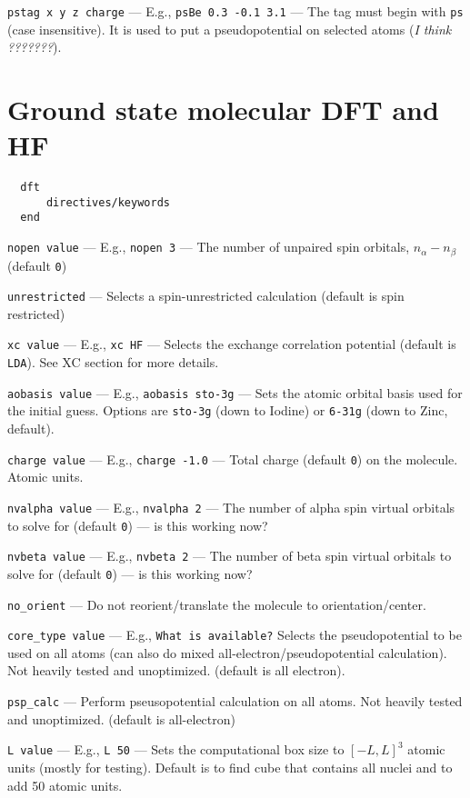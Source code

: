 \documentclass[letterpaper]{book}
\begin{document}
{\tt pstag x y z charge} --- E.g., {\tt psBe 0.3 -0.1 3.1} --- The tag must begin with {\tt ps} (case insensitive).  It is used to put a pseudopotential on selected atoms ({\em I think ???????}).


\chapter{Ground state molecular DFT and HF}

\begin{verbatim}
  dft
      directives/keywords
  end
\end{verbatim}

{\tt nopen value} --- E.g., {\tt nopen 3} --- The number of unpaired spin orbitals, $n_\alpha - n_\beta$ (default {\tt 0})

{\tt unrestricted} --- Selects a spin-unrestricted calculation (default is spin restricted)

{\tt xc value} --- E.g., {\tt xc HF} --- Selects the exchange correlation potential (default is {\tt LDA}). See XC section for more details.

{\tt aobasis value} --- E.g., {\tt aobasis sto-3g} --- Sets the atomic orbital basis used for the initial guess.  Options are {\tt sto-3g} (down to Iodine)  or {\tt 6-31g} (down to Zinc, default).  

{\tt charge value} --- E.g., {\tt charge -1.0} --- Total charge (default {\tt 0}) on the molecule. Atomic units.

{\tt nvalpha value} --- E.g., {\tt nvalpha 2} --- The number of alpha spin virtual orbitals to solve for (default {\tt 0}) --- is this working now?

{\tt nvbeta value} --- E.g., {\tt nvbeta 2} --- The number of beta spin virtual orbitals to solve for (default {\tt 0}) --- is this working now?

{\tt no\_orient} --- Do not reorient/translate the molecule to orientation/center.

{\tt core\_type value} --- E.g., {\tt What is available?} Selects the pseudopotential to be used on all atoms (can also do mixed all-electron/pseudopotential calculation).  Not heavily tested and unoptimized. (default is all electron).

{\tt psp\_calc} --- Perform pseusopotential calculation on all atoms.  Not heavily tested and unoptimized. (default is all-electron)

{\tt L value} --- E.g., {\tt L 50} --- Sets the computational box size to $[-L,L]^3$ atomic units (mostly for testing).  Default is to find cube that contains all nuclei and to add 50 atomic units.
\end{document}
